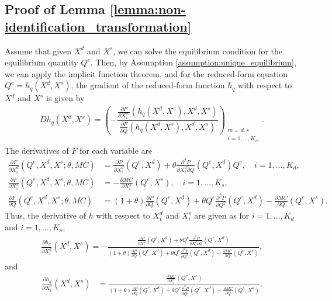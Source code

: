 \documentclass[11pt, a4paper]{article}
\theoremstyle{remark}
\begin{document}
\subsection{Proof of Lemma \ref{lemma:non-identification_transformation}}
Assume that given $X^{d}$ and $X^{s}$, we can solve the equilibrium condition for the equilibrium quantity $Q^e$.
Then, by Assumption \ref{assumption:unique_equilibrium}, we can apply the implicit function theorem, and for the reduced-form equation $Q^e = h_q(X^{d}, X^{s})$, the gradient of the reduced-form function $h_q$ with respect to $X^{d}$ and $X^{s}$ is given by
\begin{align}
    Dh_q(X^{d}, X^{s}) =  \left( -\dfrac{\frac{\partial F}{\partial X^{m}_{i}}(h_q(X^{d}, X^{s}), X^{d}, X^{s})}{\frac{\partial F}{\partial Q}(h_q(X^{d}, X^{s}), X^{d}, X^{s})} \right)_{\substack{m = d, s\\ i = 1, \ldots, K_m}}. \label{eq:foc_derivative_demand_supply}
\end{align}
The derivatives of $F$ for each variable are
\begin{align}
    \frac{\partial F}{\partial X^{d}_i}(Q^e, X^{d}, X^{s}; \theta, MC) & =  \frac{\partial P}{\partial X^{d}_{i}}(Q^e, X^{d}) + \theta\frac{\partial^2 P}{\partial X^{d}_{i}\partial Q}(Q^e, X^{d})Q^e, \quad i = 1, \ldots, K_d,\\
    \frac{\partial F}{\partial X^{s}_i}(Q^e, X^{d}, X^{s}; \theta, MC) & =  -\frac{\partial MC}{\partial X^{s}_{i}}(Q^e, X^{s}), \quad i = 1, \ldots, K_s, \\
    \frac{\partial F}{\partial Q}(Q^e, X^{d}, X^{s}; \theta, MC) & = (1+\theta)\frac{\partial P}{\partial Q}(Q^e, X^{d}) + \theta Q^e\frac{\partial^2 P}{\partial Q^2}(Q^e, X^{d}) - \frac{\partial MC}{\partial Q}(Q^e, X^{s}).
\end{align}
Thus, the derivative of $h$ with respect to $X^{d}_i$ and $X^{s}_i$ are given as for $i = 1, \ldots, K_d$ and $i = 1, \ldots, K_s$,
\begin{align}
    \frac{\partial h_q}{\partial X^{d}_{i}}(X^{d}, X^{s}) = -\frac{\frac{\partial P}{\partial X^{d}_{i}}(Q^e, X^{d}) + \theta Q^e \frac{\partial^2 P}{\partial X^{d}_{i}\partial Q}(Q^e, X^{d}) }{(1+\theta)\frac{\partial P}{\partial Q}(Q^e, X^{d}) + \theta  Q^e\frac{\partial^2 P}{\partial Q^2}(Q^e, X^{d}) - \frac{\partial MC}{\partial Q}(Q^e, X^{s})}, \label{eq:foc_derivative_demand}
\end{align}
and
\begin{align}
    \frac{\partial h_q}{\partial X^{s}_{i}}(X^{d}, X^{s}) & = \frac{\frac{\partial MC}{\partial X^{s}_{i}}(Q^e, X^{s})}{(1+\theta)\frac{\partial P}{\partial Q}(Q^e, X^{d}) + \theta  Q^e\frac{\partial^2 P}{\partial Q^2}(Q^e, X^{d}) - \frac{\partial MC}{\partial Q}(Q^e, X^{s})}. \label{eq:foc_derivative_supply}
\end{align}
\end{document}
